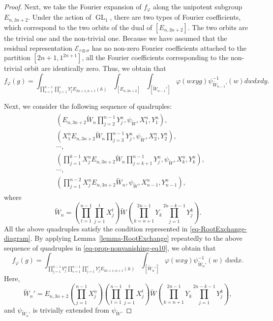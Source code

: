\documentclass[12pt]{amsart}
\newcommand{\A}{\mathbb{A}}
\newcommand{\wt}{\widetilde}
\newcommand{\CE}{{\mathcal{E}}}
\theoremstyle{remark}
\DeclareMathOperator{\GL}{GL}
\begin{document}
\begin{proof}
Next, we take the Fourier expansion of $f_{\varphi}$ along the unipotent subgroup $E_{n,3n+2}$. Under the action of $\GL_1$, there are two types of Fourier coefficients, which correspond to the two orbits of the dual of $[E_{n,3n+2}]$. The two orbits are the trivial one and the non-trivial one. Because we have assumed that the residual representation $\CE_{\tau\otimes\sigma}$ has no non-zero Fourier coefficients attached to the partition $[2n+1,1^{2n+1}]$, all the Fourier coefficients corresponding to the non-trivial orbit are identically zero. Thus, we obtain that 
\begin{equation}\label{eq-prop-nonvanishing-eq9}
f_{\varphi}(g)=\int_{\prod_{s=1}^{n-1} \prod_{j=1}^s Y^s_j
E_{2n+1,n+1}(\A)} \int_{[E_{n,3n+2}]}
\int_{[\wt{W}_{n-1}']} \varphi(wxyg) \psi^{-1}_{\wt{W}_{n-1}'}(w)dwdxdy.
\end{equation}


Next, we consider the following sequence of quadruples:
\begin{align}\label{eq-prop-nonvanishing-eq10}
\begin{split}
& (E_{n,3n+2}\wt{W}_n \prod_{j=2}^{n-1} Y^n_j, \psi_{\wt{W}}, X^n_1, Y^n_1),\\
& (X^n_1 E_{n,3n+2}\wt{W}_n \prod_{j=3}^{n-1} Y^n_j, \psi_{\wt{W}}, X^n_2, Y^n_2),\\
& \cdots,\\
& (\prod_{j=1}^{k-1} X^n_j E_{n,3n+2}\wt{W}_n \prod_{j=k+1}^{n-1} Y^n_j, \psi_{\wt{W}}, X^n_k, Y^n_k),\\
& \cdots,\\
& (\prod_{j=1}^{n-2} X^n_j E_{n,3n+2}\wt{W}_n, \psi_{\wt{W}}, X^n_{n-1}, Y^n_{n-1}),
\end{split}
\end{align}
where
\begin{equation*}
\wt{W}_n =
\left( \prod_{t=1}^{n-1} \prod_{j=1}^{t} X^t_j \right) \wt{W} \left( \prod_{k=n+1}^{2n-1} Y_k \prod_{j=1}^{2n-k-1} Y^k_j \right).
\end{equation*}
All the above quadruples satisfy the condition represented in \eqref{eq-RootExchange-diagram}. 
By applying Lemma~\ref{lemma-RootExchange} repeatedly to the above sequence of quadruples in \eqref{eq-prop-nonvanishing-eq10}, we obtain that
\begin{equation}\label{eq-prop-nonvanishing-eq11}
f_{\varphi}(g)=\int_{\prod_{j=1}^{n-1} Y^n_j \prod_{s=1}^{n-1} \prod_{j=1}^s Y^s_j
E_{2n+1,n+1}(\A)}
\int_{[\wt{W}_{n}']} \varphi(wxg) \psi^{-1}_{\wt{W}_{n}'}(w)\ \mathrm{d}w\mathrm{d}x.
\end{equation}
Here, 
\begin{equation*}
\wt{W}_{n}' = E_{n,3n+2} \left( \prod_{j=1}^{n-1} X^n_j\right)
\left( \prod_{t=1}^{n-1} \prod_{j=1}^{t} X^t_j \right) \wt{W} \left( \prod_{k=n+1}^{2n-1} Y_k \prod_{j=1}^{2n-k-1} Y^k_j \right),
\end{equation*}
and $\psi_{\wt{W}_{n}'}$ is trivially extended from
$\psi_{\wt{W}}$.



\end{proof}
\end{document}
